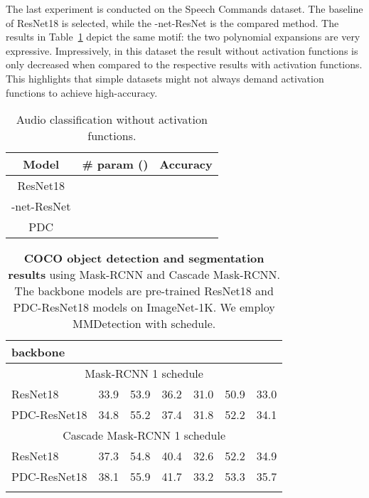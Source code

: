 \documentclass[runningheads]{llncs}
\newcommand{\resnet}{ResNet}
\newcommand{\modelres}{-net-\resnet}
\newcommand{\noshare}{PDC}
\newcommand{\tablestyle}[2]{\setlength{\tabcolsep}{#1}\renewcommand{\arraystretch}{#2}\centering\footnotesize}
\newcommand{\gr}{\rowcolor[gray]{.95}}
\begin{document}
The last experiment is conducted on the Speech Commands dataset. The baseline of \resnet18 is selected, while the \modelres{} is the compared method. The results in Table~\ref{tab:nosharing_resnet_speech_linear} depict the same motif: the two polynomial expansions are very expressive. Impressively, in this dataset the result without activation functions is only  decreased when compared to the respective results with activation functions. This highlights that simple datasets might not always demand activation functions to achieve high-accuracy. 


\begin{table}[h]
\centering
    \caption{Audio classification without activation functions.}
     \begin{tabular}{|c | c | c|}
         \hline
         \textbf{Model} &\textbf{ \# param ()} & \textbf{Accuracy}\\
        \hline
         \resnet18 &  & \\\hline
         \modelres &   & \\\hline
         \noshare &   & \\\hline
     \end{tabular}
 \label{tab:nosharing_resnet_speech_linear}
\end{table}




\begin{table}[ht!]
\caption[caption]{\textbf{COCO object detection and segmentation results} using Mask-RCNN and Cascade Mask-RCNN. The backbone models are pre-trained ResNet18 and PDC-ResNet18 models on ImageNet-1K. We employ MMDetection with  schedule.
\label{tab:grigorisrebuttal2}
}
\tablestyle{6pt}{1.1}
\addtolength{\tabcolsep}{-4.5pt}
\vspace{2ex}
\begin{tabular}{@{}lcccccc@{}}
\hline
backbone &  &  &  &  &  &   \\
\hline
\multicolumn{7}{c}{{Mask-RCNN 1 schedule}} \\
ResNet18      & 33.9 & 53.9 &36.2 &31.0 & 50.9 & 33.0 \\
\gr
PDC-ResNet18  & 34.8 & 55.2 & 37.4 & 31.8 & 52.2 & 34.1 \\
\hline
\multicolumn{7}{c}{{Cascade Mask-RCNN 1 schedule}} \\
ResNet18        & 37.3 &54.8 &40.4 &32.6 &52.2 &34.9 \\
\gr
PDC-ResNet18    & 38.1 & 55.9 & 41.7 & 33.2 & 53.3 & 35.7 \\
\hline
\\
\end{tabular}

\end{table}
\end{document}

